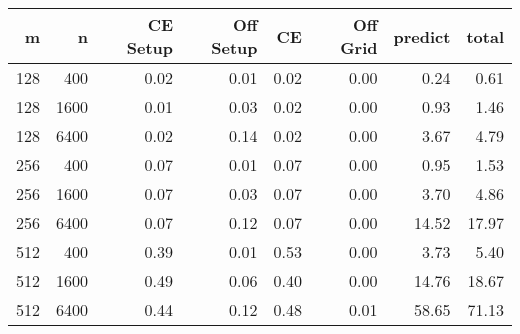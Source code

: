 \begin{table}[ht]
\centering
\begin{tabular}{rrrrrrrr}
  \hline
m & n & CE Setup & Off Setup & CE & Off Grid & predict & total \\ 
  \hline
128 & 400 & 0.02 & 0.01 & 0.02 & 0.00 & 0.24 & 0.61 \\ 
  128 & 1600 & 0.01 & 0.03 & 0.02 & 0.00 & 0.93 & 1.46 \\ 
  128 & 6400 & 0.02 & 0.14 & 0.02 & 0.00 & 3.67 & 4.79 \\ 
  256 & 400 & 0.07 & 0.01 & 0.07 & 0.00 & 0.95 & 1.53 \\ 
  256 & 1600 & 0.07 & 0.03 & 0.07 & 0.00 & 3.70 & 4.86 \\ 
  256 & 6400 & 0.07 & 0.12 & 0.07 & 0.00 & 14.52 & 17.97 \\ 
  512 & 400 & 0.39 & 0.01 & 0.53 & 0.00 & 3.73 & 5.40 \\ 
  512 & 1600 & 0.49 & 0.06 & 0.40 & 0.00 & 14.76 & 18.67 \\ 
  512 & 6400 & 0.44 & 0.12 & 0.48 & 0.01 & 58.65 & 71.13 \\ 
   \hline
\end{tabular}
\end{table}
